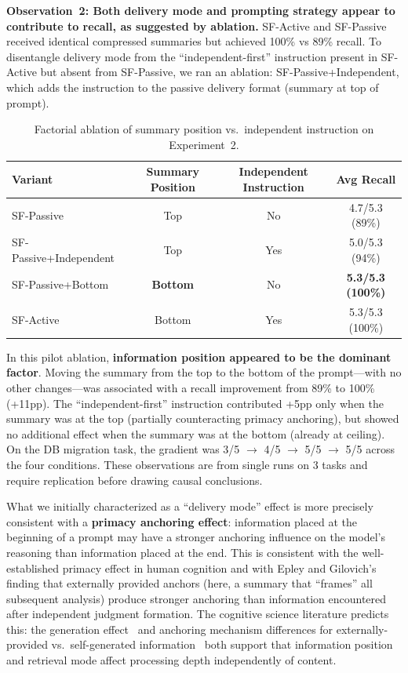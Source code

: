 \documentclass[11pt]{article}
\begin{document}
\textbf{Observation~2: Both delivery mode and prompting strategy appear to contribute to recall, as suggested by ablation.} SF-Active and SF-Passive received identical compressed summaries but achieved 100\% vs 89\% recall. To disentangle delivery mode from the ``independent-first'' instruction present in SF-Active but absent from SF-Passive, we ran an ablation: SF-Passive+Independent, which adds the instruction to the passive delivery format (summary at top of prompt).

\begin{table}[H]
\centering
\caption{Factorial ablation of summary position vs.\ independent instruction on Experiment~2.}
\label{tab:ablation}
\small
\begin{tabular}{@{}lccc@{}}
\toprule
\textbf{Variant} & \textbf{Summary Position} & \textbf{Independent Instruction} & \textbf{Avg Recall} \\
\midrule
SF-Passive              & Top    & No           & 4.7/5.3 (89\%) \\
SF-Passive+Independent  & Top    & Yes          & 5.0/5.3 (94\%) \\
SF-Passive+Bottom       & \textbf{Bottom} & No  & \textbf{5.3/5.3 (100\%)} \\
SF-Active               & Bottom & Yes          & 5.3/5.3 (100\%) \\
\bottomrule
\end{tabular}
\end{table}

In this pilot ablation, \textbf{information position appeared to be the dominant factor}. Moving the summary from the top to the bottom of the prompt---with no other changes---was associated with a recall improvement from 89\% to 100\% (+11pp). The ``independent-first'' instruction contributed +5pp only when the summary was at the top (partially counteracting primacy anchoring), but showed no additional effect when the summary was at the bottom (already at ceiling). On the DB migration task, the gradient was 3/5 $\to$ 4/5 $\to$ 5/5 $\to$ 5/5 across the four conditions. These observations are from single runs on 3 tasks and require replication before drawing causal conclusions.

What we initially characterized as a ``delivery mode'' effect is more precisely consistent with a \textbf{primacy anchoring effect}: information placed at the beginning of a prompt may have a stronger anchoring influence on the model's reasoning than information placed at the end. This is consistent with the well-established primacy effect in human cognition and with Epley and Gilovich's~\citep{epley2006anchoring} finding that externally provided anchors (here, a summary that ``frames'' all subsequent analysis) produce stronger anchoring than information encountered after independent judgment formation. The cognitive science literature predicts this: the generation effect~\citep{slamecka1978generation} and anchoring mechanism differences for externally-provided vs.\ self-generated information~\citep{epley2006anchoring} both support that information position and retrieval mode affect processing depth independently of content.
\end{document}
